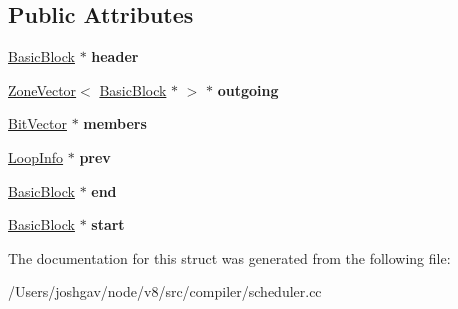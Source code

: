 \subsection*{Public Attributes}
\begin{DoxyCompactItemize}
\item 
\hyperlink{classv8_1_1internal_1_1compiler_1_1_basic_block}{Basic\+Block} $\ast$ {\bfseries header}\hypertarget{structv8_1_1internal_1_1compiler_1_1_special_r_p_o_numberer_1_1_loop_info_a8ab256ec6fcb4c6196db93da122891ba}{}\label{structv8_1_1internal_1_1compiler_1_1_special_r_p_o_numberer_1_1_loop_info_a8ab256ec6fcb4c6196db93da122891ba}

\item 
\hyperlink{classv8_1_1internal_1_1_zone_vector}{Zone\+Vector}$<$ \hyperlink{classv8_1_1internal_1_1compiler_1_1_basic_block}{Basic\+Block} $\ast$ $>$ $\ast$ {\bfseries outgoing}\hypertarget{structv8_1_1internal_1_1compiler_1_1_special_r_p_o_numberer_1_1_loop_info_a531d67c57aef098e753365b142f6f65c}{}\label{structv8_1_1internal_1_1compiler_1_1_special_r_p_o_numberer_1_1_loop_info_a531d67c57aef098e753365b142f6f65c}

\item 
\hyperlink{classv8_1_1internal_1_1_bit_vector}{Bit\+Vector} $\ast$ {\bfseries members}\hypertarget{structv8_1_1internal_1_1compiler_1_1_special_r_p_o_numberer_1_1_loop_info_ad38f717c6d7455a1f1ecbc467a880a0b}{}\label{structv8_1_1internal_1_1compiler_1_1_special_r_p_o_numberer_1_1_loop_info_ad38f717c6d7455a1f1ecbc467a880a0b}

\item 
\hyperlink{structv8_1_1internal_1_1compiler_1_1_special_r_p_o_numberer_1_1_loop_info}{Loop\+Info} $\ast$ {\bfseries prev}\hypertarget{structv8_1_1internal_1_1compiler_1_1_special_r_p_o_numberer_1_1_loop_info_aa2664e0dc9343346901a83ce1fd5e262}{}\label{structv8_1_1internal_1_1compiler_1_1_special_r_p_o_numberer_1_1_loop_info_aa2664e0dc9343346901a83ce1fd5e262}

\item 
\hyperlink{classv8_1_1internal_1_1compiler_1_1_basic_block}{Basic\+Block} $\ast$ {\bfseries end}\hypertarget{structv8_1_1internal_1_1compiler_1_1_special_r_p_o_numberer_1_1_loop_info_acc0ff3b761e95fb80381412a952c8392}{}\label{structv8_1_1internal_1_1compiler_1_1_special_r_p_o_numberer_1_1_loop_info_acc0ff3b761e95fb80381412a952c8392}

\item 
\hyperlink{classv8_1_1internal_1_1compiler_1_1_basic_block}{Basic\+Block} $\ast$ {\bfseries start}\hypertarget{structv8_1_1internal_1_1compiler_1_1_special_r_p_o_numberer_1_1_loop_info_ab42d4ae2c9201a6e5f0acf3c7fb276c6}{}\label{structv8_1_1internal_1_1compiler_1_1_special_r_p_o_numberer_1_1_loop_info_ab42d4ae2c9201a6e5f0acf3c7fb276c6}

\end{DoxyCompactItemize}


The documentation for this struct was generated from the following file\+:\begin{DoxyCompactItemize}
\item 
/\+Users/joshgav/node/v8/src/compiler/scheduler.\+cc\end{DoxyCompactItemize}

